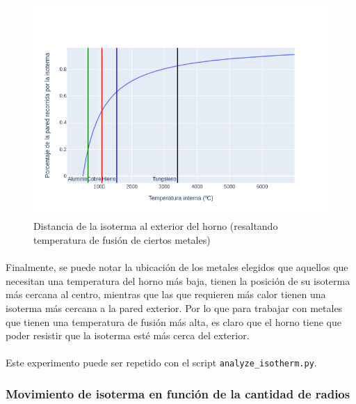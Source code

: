 \documentclass[12pt]{article}
\begin{document}
\begin{figure}[H]
  \centering
  \includegraphics[scale=0.5]{isotherm_by_inner_metals}
  \caption{Distancia de la isoterma al exterior del horno (resaltando temperatura de fusión de ciertos metales)}
  \label{fig:isotherm_by_inner_metals}
\end{figure}

\paragraph{} Finalmente, se puede notar la ubicación de los metales elegidos que aquellos que necesitan una temperatura del horno más baja, tienen la posición de su isoterma más cercana al centro, mientras que las que requieren más calor tienen una isoterma más cercana a la pared exterior. Por lo que para trabajar con metales que tienen una temperatura de fusión más alta, es claro que el horno tiene que poder resistir que la isoterma esté más cerca del exterior.

\paragraph{} Este experimento puede ser repetido con el script \texttt{analyze\_isotherm.py}.

\subsubsection{Movimiento de isoterma en función de la cantidad de radios}
\end{document}
